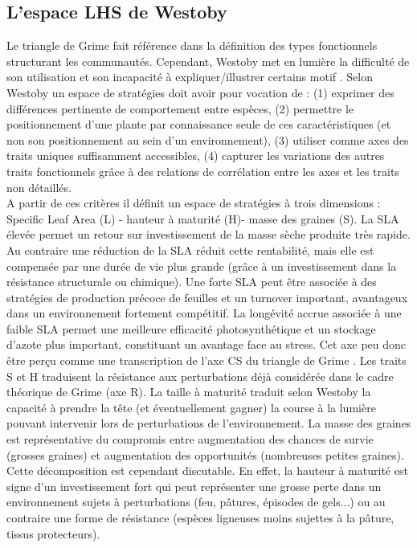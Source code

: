 \documentclass[french]{article}
\begin{document}
{%
\subsection{L'espace LHS de Westoby}
Le triangle de Grime fait référence dans la définition des types fonctionnels structurant les communautés. Cependant, Westoby met en lumière la difficulté de son utilisation et son incapacité à expliquer/illustrer certains motif \cite{Westoby1998}. Selon Westoby un espace de stratégies doit avoir pour vocation de : (1) exprimer des différences pertinente de comportement entre espèces, (2) permettre le positionnement d'une plante par connaissance seule de ces caractéristiques (et non son positionnement au sein d'un environnement), (3) utiliser comme axes des traits uniques suffisamment accessibles, (4) capturer les variations des autres traits fonctionnels grâce à des relations de corrélation entre les axes et les traits non détaillés.\\
\indent A partir de ces critères il définit un espace de stratégies à trois dimensions : Specific Leaf Area (L) - hauteur à maturité (H)- masse des graines (S). La SLA élevée permet un retour sur investissement de la masse sèche produite très rapide. Au contraire une réduction de la SLA réduit cette rentabilité, mais elle est compensée par une durée de vie plus grande (grâce à un investissement dans la résistance structurale ou chimique). Une forte SLA peut être associée à des stratégies de production précoce de feuilles et un turnover important, avantageux dans un environnement fortement compétitif. La longévité accrue associée à une faible SLA permet une meilleure efficacité photosynthétique et un stockage d'azote plus important, constituant un avantage face au stress. Cet axe peu donc être perçu comme une transcription de l'axe CS du triangle de Grime \cite{Grime1977}. Les traits S et H traduisent la résistance aux perturbations déjà considérée dans le cadre théorique de Grime (axe R). La taille à maturité traduit selon Westoby la capacité à prendre la tête (et éventuellement gagner) la course à la lumière pouvant intervenir lors de perturbations de l'environnement. La masse des graines est représentative du compromis entre augmentation des chances de survie (grosses graines) et augmentation des opportunités (nombreuses petites graines). Cette décomposition est cependant discutable. En effet, la hauteur à maturité est signe d'un investissement fort qui peut représenter une grosse perte dans un environnement sujets à perturbations (feu, pâtures, épisodes de gels...) ou au contraire une forme de résistance (espèces ligneuses moins sujettes à la pâture, tissus protecteurs).

}
\end{document}
